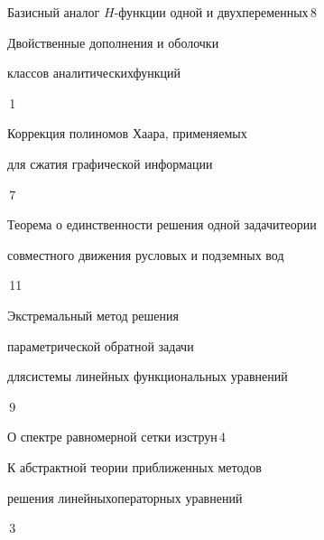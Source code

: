 



{Базисный аналог $H$-функции одной и двух\newline переменных}{\No\,8}




{Двойственные дополнения и оболочки


классов аналитических\newline функций}{\No\,1}




{Коррекция полиномов Хаара, применяемых \newline


для сжатия графической информации}{\No\,7}




{Теорема о единственности решения одной задачи\newline теории


совместного движения русловых и подземных вод}{\No\,11}




{Экстремальный метод решения


параметрической обратной задачи


для\newline системы линейных функциональных уравнений}{\No\,9}




{О спектре равномерной сетки из\newline струн}{\No\,4}




{К абстрактной теории приближенных методов 


решения линейных\newline операторных уравнений}{\No\,3}






